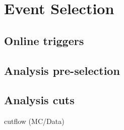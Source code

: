 \chapter{Event Selection}
\label{sec:Selection}

\section{Online triggers}
\label{sec:Sel_trig}

\section{Analysis pre-selection}
\label{sec:Sel_pre-sel}

\section{Analysis cuts}
\label{sec:Sel_cuts}

cutflow (MC/Data)
